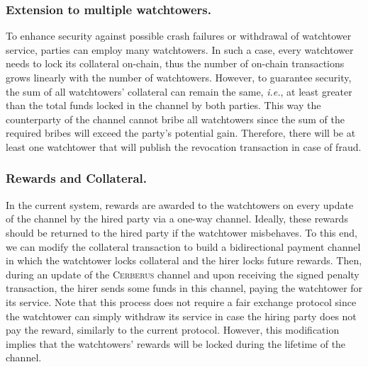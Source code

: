 \documentclass[runningheads]{llncs}
\newcommand{\ie}{{\em i.e.}}
\newcommand{\sys}{\textsc{Cerberus}\xspace}
\begin{document}
\vspace{-3pt}
\subsubsection*{Extension to multiple watchtowers.}
To enhance security against possible crash failures or withdrawal of watchtower service, parties can employ many watchtowers. In such a case, every watchtower needs to lock its collateral on-chain, thus the number of on-chain transactions grows linearly with the number of watchtowers. However, to guarantee security, the sum of all watchtowers' collateral can remain the same, \ie, at least greater than the total funds locked in the channel by both parties. This way the counterparty of the channel cannot bribe all watchtowers since the sum of the required bribes will exceed the party's potential gain. Therefore, there will be at least one watchtower that will publish the revocation transaction in case of fraud.

\vspace{-3pt}
\subsubsection*{Rewards and Collateral.}
In the current system, rewards are awarded to the watchtowers on every update of the channel by the hired party via a one-way channel. Ideally, these rewards should be returned to the hired party if the watchtower misbehaves. To this end, we can modify the collateral transaction to build a bidirectional payment channel in which the watchtower locks collateral and the hirer locks future rewards. Then, during an update of the \sys channel and upon receiving the signed penalty transaction, the hirer sends some funds in this channel, paying the watchtower for its service. Note that this process does not require a fair exchange protocol since the watchtower can simply withdraw its service in case the hiring party does not pay the reward, similarly to the current protocol. However, this modification implies that the watchtowers' rewards will be locked during the lifetime of the channel.
\end{document}
